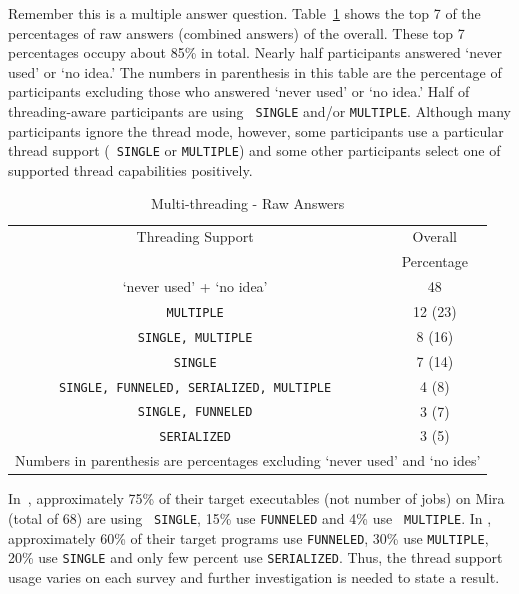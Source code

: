 \documentclass[conference,10pt,letterpaper]{IEEEtran}
\def\myquote#1{`#1'}
\begin{document}
Remember this is a multiple answer
question. Table~\ref{tab:multi-thread-raw} shows the top 7 of the 
percentages of raw answers (combined answers) of the
overall. These top 7 percentages occupy about 85\% in
total. Nearly half 
participants answered \myquote{never used} or \myquote{no idea.} The
numbers in parenthesis in this table are the percentage of 
participants excluding those who answered \myquote{never used} or
\myquote{no idea.} Half of threading-aware participants are using {\tt
  SINGLE}
and/or {\tt MULTIPLE}. Although many participants ignore the thread
mode, however, some participants use a particular thread support ({\tt
  SINGLE} or {\tt MULTIPLE}) and some other participants select one of
supported thread capabilities positively. 

\begin{table}[htb]%
  \begin{center}%
    \caption{Multi-threading - Raw Answers}\label{tab:multi-thread-raw}%
    \begin{tabular}{c|c}%
      \hline%
      Threading Support & Overall \\
      & Percentage \\
      \hline%
      \myquote{never used} + \myquote{no idea} & 48 \\
              {\tt MULTIPLE} & 12 (23) \\
              {\tt SINGLE, MULTIPLE} & 8 (16) \\
              {\tt SINGLE} & 7 (14) \\
              {\tt SINGLE, FUNNELED, SERIALIZED, MULTIPLE} & 4 (8) \\
              {\tt SINGLE, FUNNELED} & 3 (7) \\
              {\tt SERIALIZED} & 3 (5) \\
              \hline%
              \multicolumn{2}{c}{\footnotesize Numbers in parenthesis are
                percentages excluding \myquote{never used} and \myquote{no
                  ides}} 
    \end{tabular}%
  \end{center}%
\end{table}%

In~\cite{10.1109/SC.2018.00033}, approximately 75\% of their target
executables (not number of jobs) on Mira (total of 68) are using {\tt
  SINGLE}, 15\% use {\tt FUNNELED} and 4\% use {\tt
  MULTIPLE}. In \cite{10.1145/3295500.3356176},  approximately 60\% of
their target programs use {\tt FUNNELED}, 30\% use {\tt MULTIPLE}, 20\%
use {\tt SINGLE} and only few percent use {\tt SERIALIZED}. Thus, the
thread support usage varies on each survey and further investigation
is needed to state a result.
\end{document}
